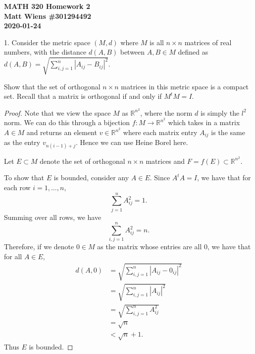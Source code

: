 \documentclass{article}
\newcommand{\R}{\mathbb{R}}
\begin{document}
\textbf{MATH 320 Homework 2} \\
\textbf{Matt Wiens \#301294492} \\
\textbf{2020-01-24}

1. Consider the metric space $(M, d)$ where $M$ is all $n \times n$
matrices of real numbers, with the distance $d(A, B)$ between $A, B
\in M$ defined as $d(A, B)= \sqrt{\sum_{i, j = 1}^n |A_{i j} - B_{i j}|^2}$.

Show that the set of orthogonal $n \times n$ matrices in this metric
space is a compact set. Recall that a matrix is orthogonal if and only
if $M^t M = I$.

\begin{proof}

Note that we view the space $M$ as $\R^{n^2}$, where the norm $d$ is
simply the $l^2$ norm. We can do this through a bijection $f: M \to
\R^{n^2}$ which takes in a matrix $A \in M$ and returns an element $v
\in \R^{n^2}$ where each matrix entry $A_{ij}$ is the same as the entry
$v_{n (i - 1) + j}$. Hence we can use Heine Borel here.

Let $E \subset M$ denote the set of orthogonal $n \times n$ matrices and
$F = f(E) \subset \R^{n^2}$.

To show that $E$ is bounded, consider any $A \in E$. Since $A^t A = I$,
we have that for each row $i = 1, \ldots, n$,
%
\begin{equation*}
    \sum_{j = 1}^n A_{ij}^2 = 1
    .
\end{equation*}
%
Summing over all rows, we have
%
\begin{equation*}
    \sum_{i, j = 1}^n A_{ij}^2 = n
    .
\end{equation*}
%
Therefore, if we denote $0 \in M$ as the matrix whose entries are all
$0$, we have that for all $A \in E$,
%
\begin{align*}
    d(A, 0)
        &= \sqrt{\sum_{i, j = 1}^n |A_{i j} - 0_{i j}|^2} \\
        &= \sqrt{\sum_{i, j = 1}^n |A_{i j}|^2} \\
        &= \sqrt{\sum_{i, j = 1}^n A_{i j}^2} \\
        &= \sqrt{n} \\
        &< \sqrt{n} + 1
        .
\end{align*}
%
Thus $E$ is bounded.


\end{proof}
\end{document}
